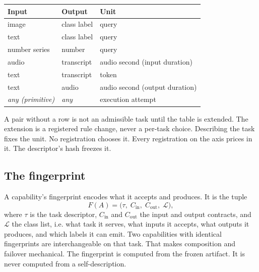 \documentclass[11pt]{article}
\begin{document}
\begin{center}
    \begin{tabular}{@{}lll@{}}
        \toprule
        \textbf{Input}         & \textbf{Output} & \textbf{Unit}                  \\
        \midrule
        image                  & class label     & query                          \\
        text                   & class label     & query                          \\
        number series          & number          & query                          \\
        audio                  & transcript      & audio second (input duration)  \\
        text                   & transcript      & token                          \\
        text                   & audio           & audio second (output duration) \\
        \emph{any (primitive)} & \emph{any}      & execution attempt              \\
        \bottomrule
    \end{tabular}
\end{center}

A pair without a row is not an admissible task until the table is
extended. The extension is a registered rule change, never a
per-task choice. Describing the task fixes the unit. No
registration chooses it. Every registration on the axis prices in
it. The descriptor's hash freezes it.

\subsection{The fingerprint}

A capability's fingerprint encodes what it accepts and produces.
It is the tuple
\begin{equation}
    F(A) = \bigl(\tau,\; C_{\mathrm{in}},\; C_{\mathrm{out}},\;
    \mathcal{L}\bigr),
\end{equation}
where $\tau$ is the task descriptor, $C_{\mathrm{in}}$ and
$C_{\mathrm{out}}$ the input and output contracts, and
$\mathcal{L}$ the class list, i.e. what task it serves,
what inputs it accepts, what outputs it produces, and which
labels it can emit. Two capabilities with identical
fingerprints are interchangeable on that task. That makes
composition and failover mechanical. The fingerprint is computed
from the frozen artifact. It is never computed from a
self-description.
\end{document}

